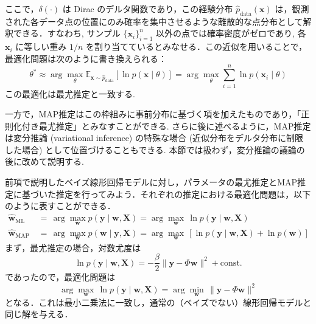 \documentclass[titlepage]{ltjsbook}
\begin{document}
ここで，$\delta(\cdot)$ は Dirac のデルタ関数であり，この経験分布 $\hat{p}_{\mathrm{data}}(\mathbf{x})$ は，観測された各データ点の位置にのみ確率を集中させるような離散的な点分布として解釈できる．すなわち, サンプル $\{\mathbf{x}_i\}_{i=1}^n$ 以外の点では確率密度がゼロであり, 各 $\mathbf{x}_i$ に等しい重み $1/n$ を割り当てているとみなせる．この近似を用いることで，最適化問題は次のように書き換えられる：
\begin{equation}
\theta^* \approx \arg\max_\theta \mathbb{E}_{\mathbf{x} \sim \hat{p}_{\mathrm{data}}} \left[ \ln p(\mathbf{x}\mid \theta) \right]
= \arg\max_\theta \sum_{i=1}^n \ln p(\mathbf{x}_i \mid \theta)
\end{equation}
この最適化は最尤推定と一致する. 

一方で，MAP推定はこの枠組みに事前分布に基づく項を加えたものであり，「正則化付き最尤推定」とみなすことができる. さらに後に述べるように，MAP推定は変分推論 (variational inference) の特殊な場合 (近似分布をデルタ分布に制限した場合) として位置づけることもできる. 本節では扱わず，変分推論の議論の後に改めて説明する. 

前項で説明したベイズ線形回帰モデルに対し，パラメータの最尤推定とMAP推定に基づいた推定を行ってみよう．それぞれの推定における最適化問題は，以下のように表すことができる．
\begin{align}
\hat{\mathbf{w}}_{\mathrm{ML}}\,&=\, \arg\max_{\mathbf{w}} p(\mathbf{y} \mid \mathbf{w}, \mathbf{X}) = \arg\max_{\mathbf{w}}\, \ln p(\mathbf{y} \mid \mathbf{w}, \mathbf{X})\\
\hat{\mathbf{w}}_{\mathrm{MAP}}\,&=\, \arg\max_{\mathbf{w}} p(\mathbf{w} \mid \mathbf{y}, \mathbf{X}) = \arg\max_{\mathbf{w}}\, \left[\ln p(\mathbf{y} \mid \mathbf{w}, \mathbf{X})+ \ln p(\mathbf{w})\right]
\end{align}
まず，最尤推定の場合，対数尤度は
\begin{equation}
\ln p(\mathbf{y} \mid \mathbf{w}, \mathbf{X})=-\frac{\beta}{2}\lVert \mathbf{y}-\Phi\mathbf{w}\rVert^2 + \text{const.}
\end{equation}
であったので，最適化問題は
\begin{equation}
\arg\max_{\mathbf{w}}\,\ln p(\mathbf{y} \mid \mathbf{w}, \mathbf{X})=\arg\min_{\mathbf{w}}\,\lVert \mathbf{y}-\Phi\mathbf{w}\rVert^2
\end{equation}
となる．これは最小二乗法に一致し，通常の（ベイズでない）線形回帰モデルと同じ解を与える．
\end{document}
